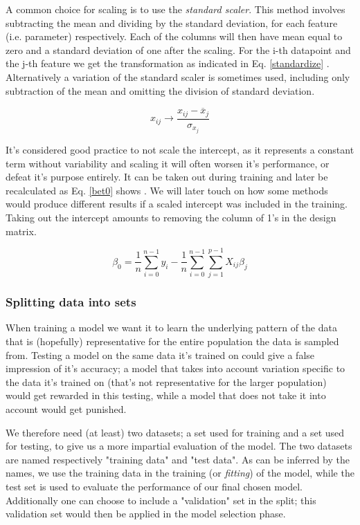 A common choice for scaling is to use the \textit{standard scaler}. This method involves subtracting the mean and dividing by the standard deviation, for each feature (i.e. parameter) respectively. Each of the columns will then have mean equal to zero and a standard deviation of one after the scaling. For the i-th datapoint and the j-th feature we get the transformation as indicated in Eq. \ref{standardize} \citep[Linear Regression]{morten}. Alternatively a variation of the standard scaler is sometimes used, including only subtraction of the mean and omitting the division of standard deviation.

\begin{equation}\label{standardize}
    x_{ij} \rightarrow \frac{x_{ij}-\overline{x}_j}{\sigma_{x_j}}
\end{equation}

It's considered good practice to not scale the intercept, as it represents a constant term without variability and scaling it will often worsen it's performance, or defeat it's purpose entirely. It can be taken out during training and later be recalculated as Eq. \ref{bet0} shows \citep[Resampling methods]{morten}. We will later touch on how some methods would produce different results if a scaled intercept was included in the training. Taking out the intercept amounts to removing the column of 1's in the design matrix. 

\begin{equation}\label{bet0}
    \beta_0 = \frac{1}{n}\sum_{i=0}^{n-1}y_i - \frac{1}{n}\sum_{i=0}^{n-1}\sum_{j=1}^{p-1}X_{ij}\beta_j
\end{equation}

\subsubsection{Splitting data into sets}\label{overfitting}

When training a model we want it to learn the underlying pattern of the data that is (hopefully) representative for the entire population the data is sampled from. 
Testing a model on the same data it's trained on could give a false impression of it's accuracy; a model that takes into account variation specific to the data it's trained on (that's not representative for the larger population) would get rewarded in this testing, while a model that does not take it into account would get punished. 

We therefore need (at least) two datasets; a set used for training and a set used for testing, to give us a more impartial evaluation of the model. The two datasets are named respectively "training data" and "test data". As can be inferred by the names, we use the training data in the training (or \textit{fitting}) of the model, while the test set is used to evaluate the performance of our final chosen model. 
Additionally one can choose to include a "validation" set in the split; this validation set would then be applied in the model selection phase.

